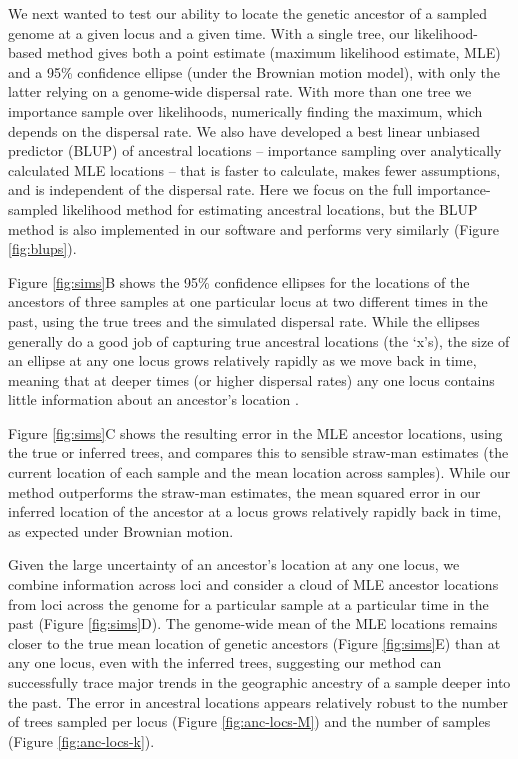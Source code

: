 \documentclass[12pt]{article}
\begin{document}
We next wanted to test our ability to locate the genetic ancestor of a sampled genome at a given locus and a given time. With a single tree, our likelihood-based method gives both a point estimate (maximum likelihood estimate, MLE) and a 95\% confidence ellipse (under the Brownian motion model), with only the latter relying on a genome-wide dispersal rate. With more than one tree we importance sample over likelihoods, numerically finding the maximum, which depends on the dispersal rate. We also have developed a best linear unbiased predictor (BLUP) of ancestral locations -- importance sampling over analytically calculated MLE locations -- that is faster to calculate, makes fewer assumptions, and is independent of the dispersal rate. Here we focus on the full importance-sampled likelihood method for estimating ancestral locations, but the BLUP method is also implemented in our software and performs very similarly (Figure \ref{fig:blups}).

Figure \ref{fig:sims}B shows the 95\% confidence ellipses for the locations of the ancestors of three samples at one particular locus at two different times in the past, using the true trees and the simulated dispersal rate. While the ellipses generally do a good job of capturing true ancestral locations (the `x's), the size of an ellipse at any one locus grows relatively rapidly as we move back in time, meaning that at deeper times (or higher dispersal rates) any one locus contains little information about an ancestor's location \citep[as is the case for ancestral state reconstruction in phylogenetics;][]{schluter1997likelihood}.

Figure \ref{fig:sims}C shows the resulting error in the MLE ancestor locations, using the true or inferred trees, and compares this to sensible straw-man estimates (the current location of each sample and the mean location across samples). While our method outperforms the straw-man estimates, the mean squared error in our inferred location of the ancestor at a locus grows relatively rapidly back in time, as expected under Brownian motion.

Given the large uncertainty of an ancestor's location at any one locus, we combine information across loci and consider a cloud of MLE ancestor locations from loci across the genome for a particular sample at a particular time in the past (Figure \ref{fig:sims}D). The genome-wide mean of the MLE locations remains closer to the true mean location of genetic ancestors (Figure \ref{fig:sims}E) than at any one locus, even with the inferred trees, suggesting our method can successfully trace major trends in the geographic ancestry of a sample deeper into the past. The error in ancestral locations appears relatively robust to the number of trees sampled per locus (Figure \ref{fig:anc-locs-M}) and the number of samples (Figure \ref{fig:anc-locs-k}).
\end{document}

